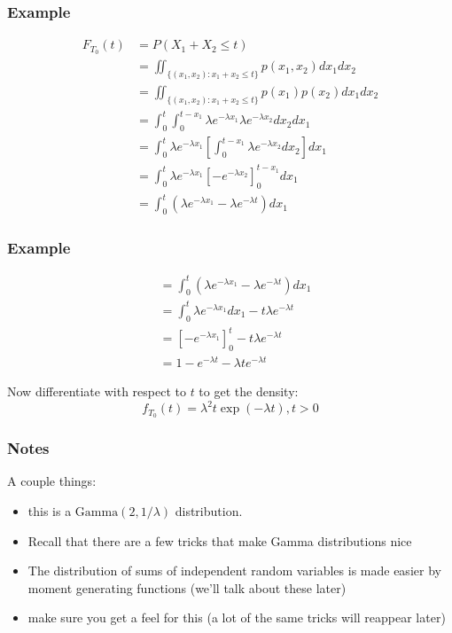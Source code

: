 \documentclass{beamer}
\begin{document}
\begin{frame}
\frametitle{Example}

\begin{align*}
F_{T_0}(t) &= P(X_1 + X_2 \le t) \\
&= \iint_{ \{(x_1, x_2) : x_1 + x_2 \le t\} } p(x_1, x_2) dx_1 dx_2 \\
&= \iint_{ \{(x_1, x_2) : x_1 + x_2 \le t\} } p(x_1)p(x_2) dx_1 dx_2 \\
&= \int_0^t \int_0^{t-x_1}\lambda e^{-\lambda x_1}\lambda e^{-\lambda x_2} dx_2 dx_1 \\
&= \int_0^t \lambda e^{-\lambda x_1} \left[ \int_0^{t-x_1}\lambda e^{-\lambda x_2} dx_2 \right] dx_1 \\
&= \int_0^t \lambda e^{-\lambda x_1}  \left[- e^{-\lambda x_2} \right]_0^{t-x_1} dx_1 \\
&= \int_0^t \left( \lambda e^{- \lambda x_1} - \lambda e^{- \lambda t}\right)dx_1 
\end{align*}

\end{frame}


\begin{frame}
\frametitle{Example}

\begin{align*}
&= \int_0^t \left( \lambda e^{- \lambda x_1} - \lambda e^{- \lambda t}\right)dx_1 \\
&= \int_0^t \lambda e^{- \lambda x_1}dx_1 - t \lambda e^{- \lambda t} \\
&= \left[-e^{-\lambda x_1} \right]_0^t - t\lambda e ^{- \lambda t} \\
&= 1 - e^{- \lambda t} - \lambda t e^{- \lambda t}
\end{align*}

Now differentiate with respect to $t$ to get the density:
\[
f_{T_0}(t) = \lambda ^2 t \exp(- \lambda t), t > 0
\]

\end{frame}


\begin{frame}
\frametitle{Notes}
A couple things:

\begin{itemize}
\item this is a $\text{Gamma}(2, 1/\lambda)$ distribution.
\item Recall that there are a few tricks that make Gamma distributions nice 
\item The distribution of sums of independent random variables is made easier by moment generating functions (we'll talk about these later)
\item make sure you get a feel for this (a lot of the same tricks will reappear later)
\end{itemize}

\end{frame}
\end{document}
